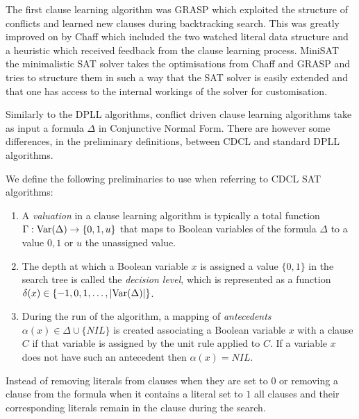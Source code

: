 The first clause learning algorithm was GRASP \cite{MS99,MS96} which exploited the structure of conflicts and learned new clauses during backtracking search. This was greatly improved on by Chaff \cite{LZ01} which included the two watched literal data structure and a heuristic which received feedback from the clause learning process. MiniSAT \cite{NE04} the minimalistic SAT solver takes the optimisations from Chaff and GRASP and tries to structure them in such a way that the SAT solver is easily extended and that one has access to the internal workings of the solver for customisation.

Similarly to the DPLL algorithms, conflict driven clause learning algorithms take as input a formula $\Delta$ in Conjunctive Normal Form. There are however some differences, in the preliminary definitions, between  CDCL and standard DPLL algorithms.
\medskip
\begin{mydef}
We define the following preliminaries to use when referring to CDCL SAT algorithms:
\begin{enumerate}
\item A \emph{valuation} in a clause learning algorithm is typically a total function $\Gamma : \mathrm{Var}(\Delta) \to \{0,1,u\}$ that maps to Boolean variables of the formula $\Delta$ to a value $0,1$ or $u$ the unassigned value.

\item The depth at which a Boolean variable $x$ is assigned a value $\{0,1\}$ in the search tree is called the \emph{decision level}, which is represented as a function $\delta(x) \in \{-1,0,1, \ldots, |\mathrm{Var}(\Delta)| \} $. 

\item During the run of the algorithm, a mapping of \emph{antecedents} $\alpha(x) \in \Delta \cup \{NIL\}$ is created associating a Boolean variable $x$ with a clause $C$ if that variable is assigned by the unit rule applied to $C$. If a variable $x$ does not have such an antecedent then $\alpha(x) = NIL$.
\end{enumerate}
\end{mydef}

Instead of removing literals from clauses when they are set to $0$ or removing a clause from the formula when it contains a literal set to $1$ all clauses and their corresponding literals remain in the clause during the search. 
